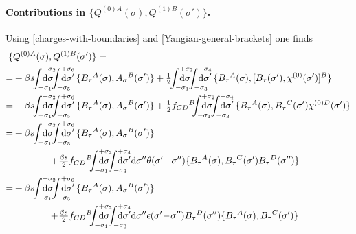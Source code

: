 \documentclass[12pt]{article}
\numberwithin{equation}{section}
\begin{document}
\paragraph{Contributions in $\{Q^{(0)A}(\sigma),Q^{(1)B}(\sigma')\}$.} \quad
Using \eqref{charges-with-boundaries} and \eqref{Yangian-general-brackets} one finds
\begin{align}
\{&Q^{(0)A}(\sigma),Q^{(1)B}(\sigma')\}=
\notag \\
=&+\beta s \!\!\int_{-\sigma_{1}}^{+\sigma_{2}}\!\!\!\!\!\!\!\!\!\!\mathrm{d}\sigma
\!\!\int_{-\sigma_{5}}^{+\sigma_{6}}\!\!\!\!\!\!\!\!\!\!\mathrm{d}\sigma' \,\{B_{\tau}{}^{A}(\sigma),A_{\sigma}{}^{B}(\sigma')\}
+ \tfrac{1}{2} \!\! \int_{-\sigma_{1}}^{+\sigma_{2}}\!\!\!\!\!\!\!\!\!\!\mathrm{d}\sigma \!\! \int_{-\sigma_{3}}^{+\sigma_{4}}\!\!\!\!\!\!\!\!\!\!\mathrm{d}\sigma' \, \{B_{\tau}{}^{A}(\sigma),[B_{\tau}{}(\sigma'),\chi^{(0)}(\sigma')]^{B}\}
\notag \\
=&+\beta s \!\! \int_{-\sigma_{1}}^{+\sigma_{2}}\!\!\!\!\!\!\!\!\!\!\mathrm{d}\sigma
\!\! \int_{-\sigma_{5}}^{+\sigma_{6}}\!\!\!\!\!\!\!\!\!\!\mathrm{d}\sigma' \,\{B_{\tau}{}^{A}(\sigma),A_{\sigma}{}^{B}(\sigma')\}
+ \tfrac{1}{2}f_{CD}{}^{B}\!\!\! \int_{-\sigma_{1}}^{+\sigma_{2}}\!\!\!\!\!\!\!\!\!\!\mathrm{d}\sigma \!\! \int_{-\sigma_{3}}^{+\sigma_{4}}\!\!\!\!\!\!\!\!\!\!\mathrm{d}\sigma' \, \{B_{\tau}{}^{A}(\sigma),B_{\tau}{}^{C}(\sigma')\chi^{(0)D}(\sigma')\}
\notag \\
=&+\beta s \!\! \int_{-\sigma_{1}}^{+\sigma_{2}}\!\!\!\!\!\!\!\!\!\!\mathrm{d}\sigma
\!\! \int_{-\sigma_{5}}^{+\sigma_{6}}\!\!\!\!\!\!\!\!\!\!\mathrm{d}\sigma' \,\{B_{\tau}{}^{A}(\sigma),A_{\sigma}{}^{B}(\sigma')\}
\notag \\
& \qquad \qquad \!+\!\tfrac{\beta s}{2}f_{CD}{}^{B}\!\!\!\int_{-\sigma_{1}}^{+\sigma_{2}}\!\!\!\!\!\!\!\!\!\!\mathrm{d}\sigma \!\! \int_{-\sigma_{3}}^{+\sigma_{4}}\!\!\!\!\!\!\!\!\!\!\mathrm{d}\sigma'\mathrm{d}\sigma''  \theta(\sigma'\!-\!\sigma'') \{B_{\tau}{}^{A}(\sigma),B_{\tau}{}^{C}(\sigma')B_{\tau}{}^{D}(\sigma'')\}
\notag \\
=&+\beta s \!\! \int_{-\sigma_{1}}^{+\sigma_{2}}\!\!\!\!\!\!\!\!\!\!\mathrm{d}\sigma
\!\! \int_{-\sigma_{5}}^{+\sigma_{6}}\!\!\!\!\!\!\!\!\!\!\mathrm{d}\sigma' \,\{B_{\tau}{}^{A}(\sigma),A_{\sigma}{}^{B}(\sigma')\}
\notag \\
&\qquad \qquad \!+\!\tfrac{\beta s}{2}f_{CD}{}^{B}\!\!\!\int_{-\sigma_{1}}^{+\sigma_{2}}\!\!\!\!\!\!\!\!\!\!\mathrm{d}\sigma \!\! \int_{-\sigma_{3}}^{+\sigma_{4}}\!\!\!\!\!\!\!\!\!\!\mathrm{d}\sigma'\mathrm{d}\sigma''  \epsilon(\sigma'\!-\!\sigma'') B_{\tau}{}^{D}(\sigma'') \{B_{\tau}{}^{A}(\sigma),B_{\tau}{}^{C}(\sigma')\}

\end{align}
\end{document}
